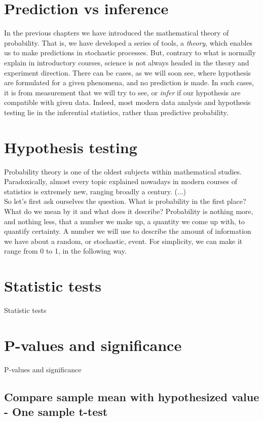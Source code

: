 \documentclass{book}
\begin{document}
\section{Prediction vs inference}
In the previous chapters we have introduced the mathematical theory of probability. That is, we have developed a series of tools, a \textit{theory}, which enables us to make predictions in stochastic processes. But, contrary to what is normally explain in introductory courses, science is not always headed in the theory and experiment direction. There can be cases, as we will soon see, where hypothesis are formulated for a given phenomena, and no prediction is made. In such cases, it is from measurement that we will try to see, or \textit{infer} if our hypothesis are compatible with given data. Indeed, most modern data analysis and hypothesis testing lie in the inferential statistics, rather than predictive probability.

\section{Hypothesis testing}
Probability theory is one of the oldest subjects within mathematical studies. Paradoxically, almost every topic explained nowadays in modern courses of statistics is extremely new, ranging broadly a century. (...)\\

So let's first ask ourselves the question. What is probability in the first place? What do we mean by it and what does it describe? Probability is nothing more, and nothing less, that a number we make up, a quantity we come up with, to quantify certainty. A number we will use to describe the amount of information we have about a random, or stochastic, event. For simplicity, we can make it range from 0 to 1, in the following way.

\section{Statistic tests}
Statistic tests

\section{P-values and significance}
P-values and significance

\subsection*{Compare sample mean with hypothesized value - One sample t-test}
\end{document}
